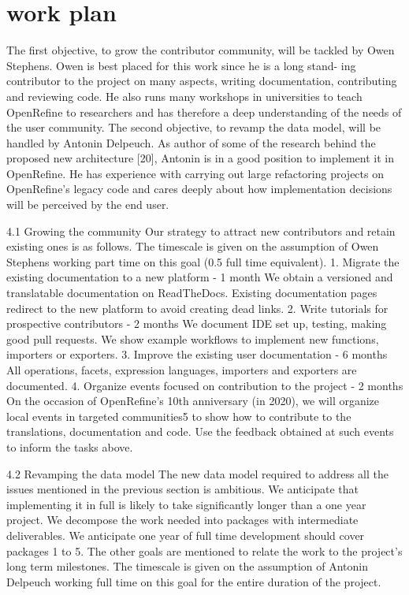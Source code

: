 \documentclass[]{elsarticle} %
\begin{document}
\hypertarget{work-plan}{%
\section{work plan}\label{work-plan}}

The first objective, to grow the contributor community, will be tackled by
Owen Stephens. Owen is best placed for this work since he is a long stand-
ing contributor to the project on many aspects, writing documentation, contributing and reviewing code. He also runs many workshops in universities
to teach OpenRefine to researchers and has therefore a deep understanding
of the needs of the user community.
The second objective, to revamp the data model, will be handled by Antonin Delpeuch. As author of some of the research behind the proposed new
architecture {[}20{]}, Antonin is in a good position to implement it in OpenRefine. He has experience with carrying out large refactoring projects on OpenRefine's legacy code and cares deeply about how implementation decisions
will be perceived by the end user.

4.1 Growing the community
Our strategy to attract new contributors and retain existing ones is as follows.
The timescale is given on the assumption of Owen Stephens working part
time on this goal (0.5 full time equivalent).
1. Migrate the existing documentation to a new platform - 1 month
We obtain a versioned and translatable documentation on ReadTheDocs. Existing documentation pages redirect to the new platform to
avoid creating dead links.
2. Write tutorials for prospective contributors - 2 months
We document IDE set up, testing, making good pull requests. We
show example workflows to implement new functions, importers or
exporters.
3. Improve the existing user documentation - 6 months
All operations, facets, expression languages, importers and exporters
are documented.
4. Organize events focused on contribution to the project - 2 months
On the occasion of OpenRefine's 10th anniversary (in 2020), we will
organize local events in targeted communities5
to show how to contribute to the translations, documentation and code. Use the feedback
obtained at such events to inform the tasks above.

4.2 Revamping the data model
The new data model required to address all the issues mentioned in the
previous section is ambitious. We anticipate that implementing it in full is
likely to take significantly longer than a one year project. We decompose the
work needed into packages with intermediate deliverables. We anticipate
one year of full time development should cover packages 1 to 5. The other
goals are mentioned to relate the work to the project's long term milestones.
The timescale is given on the assumption of Antonin Delpeuch working full
time on this goal for the entire duration of the project.
\end{document}

